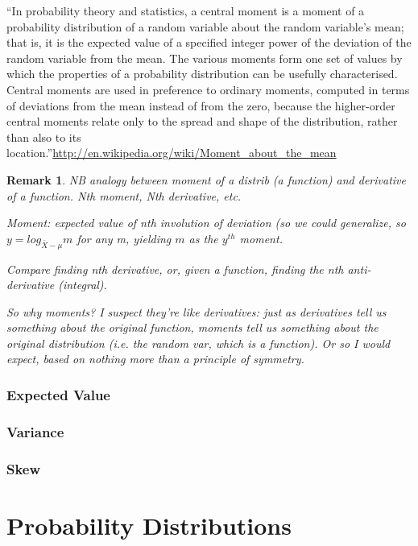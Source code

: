 \documentclass[reqno,12pt]{tufte-book}
\numberwithin{equation}{subsection}
\newtheorem{remark}{Remark}
\begin{document}
``In probability theory and statistics, a central moment is a moment of a probability distribution of a random variable about the random variable's mean; that is, it is the expected value of a specified integer power of the deviation of the random variable from the mean. The various moments form one set of values by which the properties of a probability distribution can be usefully characterised. Central moments are used in preference to ordinary moments, computed in terms of deviations from the mean instead of from the zero, because the higher-order central moments relate only to the spread and shape of the distribution, rather than also to its location.''\url{http://en.wikipedia.org/wiki/Moment_about_the_mean}

\begin{remark}
  NB analogy between moment of a distrib (a function) and derivative
  of a function.  Nth moment, Nth derivative, etc.

  Moment: expected value of nth involution of deviation (so we could
  generalize, so $y = log_{\bar{X}-\mu} m$ for any m, yielding $m$ as
  the $y^{th}$ moment.

  Compare finding nth derivative, or, given a function, finding the
  nth anti-derivative (integral).

  So why moments?  I suspect they're like derivatives: just as
  derivatives tell us something about the original function, moments
  tell us something about the original distribution (i.e. the random
  var, which is a function).  Or so I would expect, based on nothing
  more than a principle of symmetry.
\end{remark}

\subsection{Expected Value}

\subsection{Variance}

\subsection{Skew}

\chapter{Probability Distributions}
\end{document}
